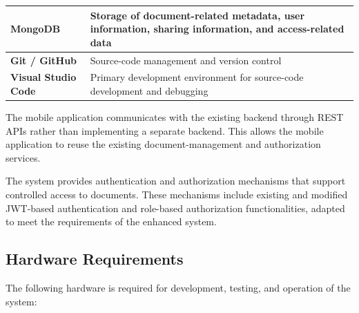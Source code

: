 \documentclass[12pt]{article}
\begin{document}
\begin{table}[h]
\begin{tabular}{|p{4cm}|p{9cm}|}
\textbf{MongoDB} & Storage of document-related metadata, user information, sharing information, and access-related data \\ \hline

\textbf{Git / GitHub} & Source-code management and version control \\ \hline

\textbf{Visual Studio Code} & Primary development environment for source-code development and debugging \\ \hline

\end{tabular}
\end{table}

The mobile application communicates with the existing backend through REST APIs rather than implementing a separate backend. This allows the mobile application to reuse the existing document-management and authorization services.

The system provides authentication and authorization mechanisms that support controlled access to documents. These mechanisms include existing and modified JWT-based authentication and role-based authorization functionalities, adapted to meet the requirements of the enhanced system.

\subsection{Hardware Requirements}

The following hardware is required for development, testing, and operation of the system:
\end{document}

